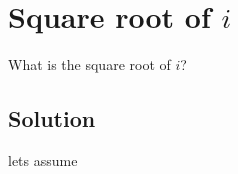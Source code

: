 \section {Square root of $i$}

What is the square root of $i$?

\subsection{Solution}

lets assume 
